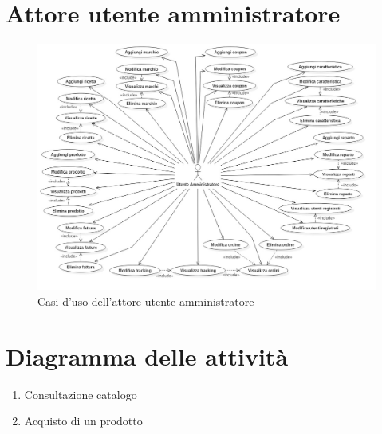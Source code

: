 \section{Attore utente amministratore}
%
%
\begin{figure}[h]
	\centering
	\includegraphics[width=1\textwidth]
	{immagini/attore-utente-amministratore}
	
	\caption{Casi d'uso dell'attore utente amministratore}
\end{figure}

\section{Diagramma delle attività}
\begin{enumerate}
	\item
	Consultazione catalogo
	
	\item
	Acquisto di un prodotto
	
\end{enumerate}